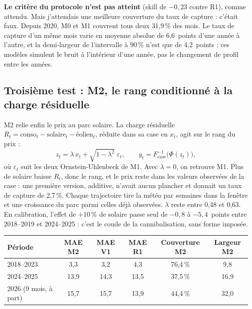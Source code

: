 \documentclass[11pt,a4paper]{article}
\newcounter{qr}
\begin{document}
\begin{attention}
\textbf{Le critère du protocole n'est pas atteint} (skill de $-0{,}23$ contre R1), comme attendu. Mais j'attendais une meilleure couverture du taux de capture : c'était faux. Depuis 2020, M0 et M1 couvrent tous deux 31,9\,\% des mois. Le taux de capture d'un même mois varie en moyenne absolue de 6,6~points d'une année à l'autre, et la demi-largeur de l'intervalle à 90\,\% n'est que de 4,2~points : ces modèles simulent le bruit à l'intérieur d'une année, pas le changement de profil entre les années.
\end{attention}

\subsection{Troisième test : M2, le rang conditionné à la charge résiduelle}

M2 relie enfin le prix au parc solaire. La charge résiduelle $R_t = \text{conso}_t - \text{solaire}_t - \text{éolien}_t$, réduite dans sa case en $x_t$, agit sur le rang du prix :
\[
z_t = \lambda\, x_t + \sqrt{1-\lambda^2}\;\varepsilon_t ,
\qquad
y_t = F^{-1}_{\text{case}}\big(\Phi(z_t)\big),
\]
où $\varepsilon_t$ suit les deux Ornstein-Uhlenbeck de M1. Avec $\lambda = 0$, on retrouve M1. Plus de solaire baisse $R_t$, donc le rang, et le prix reste dans les valeurs observées de la case : une première version, additive, n'avait aucun plancher et donnait un taux de capture de 2,7\,\%. Chaque trajectoire tire la météo par semaines dans la fenêtre et une croissance du parc parmi celles déjà observées. $\lambda$ reste entre 0,48 et 0,63. En calibration, l'effet de $+10\,\%$ de solaire passe seul de $-0{,}8$ à $-5{,}4$~points entre 2018--2019 et 2024--2025 : c'est le coude de la cannibalisation, sans forme imposée.

\begin{center}
\small
\begin{tabular}{lccccc}
\toprule
\textbf{Période} & \textbf{MAE M2} & \textbf{MAE V1} & \textbf{MAE R1} & \textbf{Couverture M2} & \textbf{Largeur M2} \\
\midrule
2018--2023 & 3,3 & 3,2 & 4,3 & 76,4\,\% & 9,8 \\
2024--2025 & 13,9 & 14,3 & 13,5 & 37,5\,\% & 16,9 \\
2026 (9 mois, à part) & 15,7 & 15,7 & 13,9 & 44,4\,\% & 32,0 \\
\bottomrule
\end{tabular}
\end{center}
\end{document}
